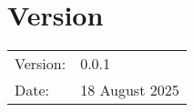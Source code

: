 \section*{Version}
\begin{tabular}{ll}
    Version: & 0.0.1 \\
    Date: & 18 August 2025 \\
\end{tabular}
